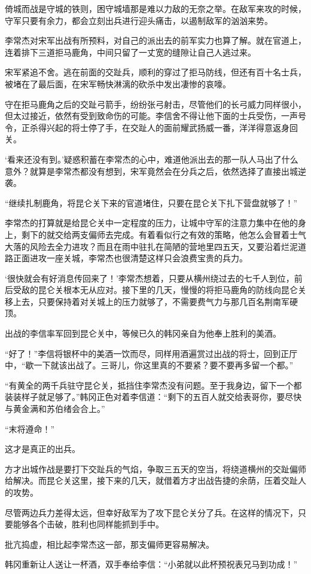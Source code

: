 倚城而战是守城的铁则，困守城墙那是难以力敌的无奈之举。在敌军来攻的时候，守军只要有余力，都会立刻出兵进行迎头痛击，以遏制敌军的汹汹来势。

李常杰对宋军出战有所预料，对自己的派出去的前军实力也算了解。就在官道上，连着排下三道拒马鹿角，中间只留了一丈宽的缝隙让自己人逃过来。

宋军紧追不舍。逃在前面的交趾兵，顺利的穿过了拒马防线，但还有百十名士兵，被堵在了最后面，在宋军畅快淋漓的砍杀中发出凄惨的哀嚎。

守在拒马鹿角之后的交趾弓箭手，纷纷张弓射击，尽管他们的长弓威力同样很小，但太过接近，依然有受到致命伤的可能。李信舍不得让他下面的士兵受伤，一声号令，正杀得兴起的将士停了手，在交趾人的面前耀武扬威一番，洋洋得意返身回关。

‘看来还没有到。’疑惑积蓄在李常杰的心中，难道他派出去的那一队人马出了什么意外？就算是李常杰都没有想到，宋军竟然会在分兵之后，依然选择了直接出城逆袭。

“继续扎制鹿角，将昆仑关下来的官道堵住，只要在昆仑关下扎下营盘就够了！”

李常杰的打算就是给昆仑关中一定程度的压力，让城中守军的注意力集中在他的身上，剩下的就交给两支偏师去完成。有着看似行之有效的策略，他怎么会冒着士气大落的风险去全力进攻？而且在雨中驻扎在简陋的营地里四五天，又要沿着烂泥道路正面进攻一座关城，李常杰也很清楚这样只会浪费宝贵的兵力。

‘很快就会有好消息传回来了！’李常杰想着，只要从横州绕过去的七千人到位，前后受敌的昆仑关根本无从应对。接下里的几天，慢慢的将拒马鹿角的防线向昆仑关移上去，只要保持着对关城上的压力就够了，不需要费气力与那几百名荆南军硬顶。

出战的李信率军回到昆仑关中，等候已久的韩冈亲自为他奉上胜利的美酒。

“好了！”李信将银杯中的美酒一饮而尽，同样用酒遍赏过出战的将士，回到正厅中，“歇一下就该出战了。三哥儿，你这里真的不要紧？要不要再多留一个都。”

“有黄全的两千兵驻守昆仑关，抵挡住李常杰没有问题。至于我身边，留下一个都装装样子就足够了。”韩冈正色对着李信道：“剩下的五百人就交给表哥你，要尽快与黄金满和苏伯绪会合上。”

“末将遵命！”

这才是真正的出兵。

方才出城作战是要打下交趾兵的气焰，争取三五天的空当，将绕道横州的交趾偏师给解决。而昆仑关这里，接下来的几天，就借着方才出战告捷的余荫，压着交趾人的攻势。

尽管两边兵力差得太远，但幸好敌军为了攻下昆仑关分了兵。在这样的情况下，只要能够各个击破，胜利也同样能抓到手中。

批亢捣虚，相比起李常杰这一部，那支偏师更容易解决。

韩冈重新让人送让一杯酒，双手奉给李信：“小弟就以此杯预祝表兄马到功成！”

